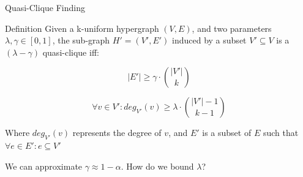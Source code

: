 \documentclass[10pt]{beamer}
\begin{document}
\begin{frame}{Quasi-Clique Finding}
    \begin{alertblock}{Definition}
    Given a k-uniform hypergraph $(V,E)$, and two parameters $\lambda, \gamma \in [0,1]$,
    the sub-graph $H'=(V',E')$ induced by a subset $V' \subseteq V$ is a
    $(\lambda-\gamma)$ quasi-clique iff:
    
    \begin{equation}
        |E'| \ge \gamma \cdot \binom{|V'|}{k}
        \label{eq:edge_hyperclique}
    \end{equation}
    
    \begin{equation}
        \forall v \in V': deg_{V'}(v) \ge \lambda \cdot \binom{|V'| - 1}{k - 1}
        \label{eq:deg_hyperclique}
    \end{equation}

    Where $deg_{V'}(v)$ represents the degree of $v$, and $E'$ is a subset of $E$ such that
    $\forall e \in E' : e \subseteq V'$
    \end{alertblock}
    
    We can approximate $\gamma \approx 1 - \alpha$. How do we bound $\lambda$?

\end{frame}
\end{document}

